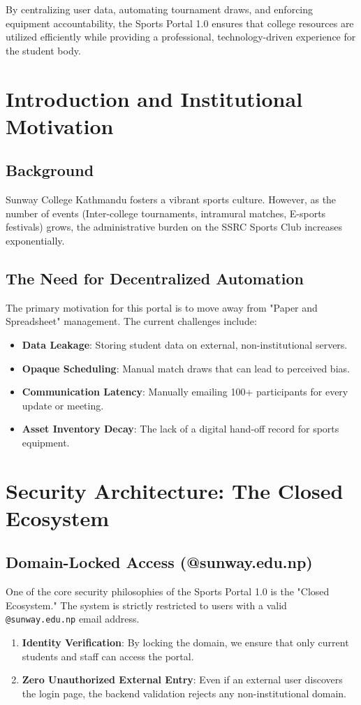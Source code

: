 \documentclass[12pt,a4paper]{article}
\begin{document}
By centralizing user data, automating tournament draws, and enforcing equipment accountability, the Sports Portal 1.0 ensures that college resources are utilized efficiently while providing a professional, technology-driven experience for the student body.

\section{Introduction and Institutional Motivation}

\subsection{Background}
Sunway College Kathmandu fosters a vibrant sports culture. However, as the number of events (Inter-college tournaments, intramural matches, E-sports festivals) grows, the administrative burden on the SSRC Sports Club increases exponentially. 

\subsection{The Need for Decentralized Automation}
The primary motivation for this portal is to move away from "Paper and Spreadsheet" management. The current challenges include:
\begin{itemize}
    \item \textbf{Data Leakage}: Storing student data on external, non-institutional servers.
    \item \textbf{Opaque Scheduling}: Manual match draws that can lead to perceived bias.
    \item \textbf{Communication Latency}: Manually emailing 100+ participants for every update or meeting.
    \item \textbf{Asset Inventory Decay}: The lack of a digital hand-off record for sports equipment.
\end{itemize}

\section{Security Architecture: The Closed Ecosystem}

\subsection{Domain-Locked Access (@sunway.edu.np)}
One of the core security philosophies of the Sports Portal 1.0 is the "Closed Ecosystem." The system is strictly restricted to users with a valid \texttt{@sunway.edu.np} email address.
\begin{enumerate}
    \item \textbf{Identity Verification}: By locking the domain, we ensure that only current students and staff can access the portal.
    \item \textbf{Zero Unauthorized External Entry}: Even if an external user discovers the login page, the backend validation rejects any non-institutional domain.
\end{enumerate}
\end{document}
